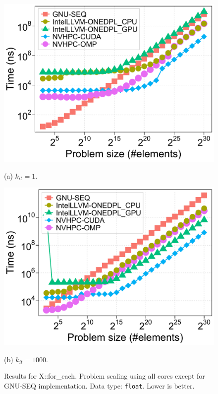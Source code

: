 \documentclass[sigconf]{acmart}
\begin{document}
\begin{figure}[H]
      \centering
      \begin{minipage}[t]{0.48\linewidth}
            \centering
            \includegraphics[width=\linewidth]{figures/problemSize_time_gpu-for_each-k1}
            \caption*{(a) $k_{it} = 1$.}
      \end{minipage}
      \hfill
      \begin{minipage}[t]{0.48\linewidth}
            \centering
            \includegraphics[width=\linewidth]{figures/problemSize_time_gpu-for_each-k1000}
            \caption*{(b) $k_{it} = 1000$.}
      \end{minipage}
      \caption{Results for X::for\_each. Problem scaling using all cores except for GNU-SEQ implementation.
            Data type: \texttt{float}. Lower is better.}
      \label{fig:gpu_problemSize_time-for_each}
\end{figure}
\end{document}
